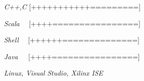 \begin{cvline}
  \cvsingleline 
    {
      \begin{cvitems}
          \item {\it{C++,C}}  {[+++++++++++=========]}
          \item {\it{Scala\,\,\,\,\,\,}}  {[++++================]}
          \item {\it{Shell\,\,\,\,\,\,}}  {[++++++==============]}
          \item {\it{Java\,\,\,\,\,\,\,}}   {[++++================]}
          \item {\it{Linux, Visual Studio, Xilinx ISE}}
      \end{cvitems}
    }
\end{cvline}
